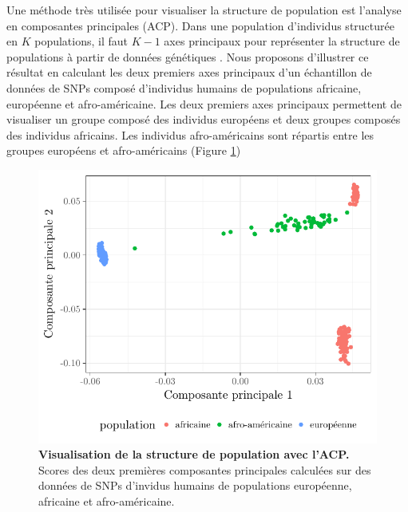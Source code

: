 \documentclass[12pt,a4paper,twoside]{ugathesis}
\begin{document}
Une méthode très utilisée pour visualiser la structure de population est
l'analyse en composantes principales (ACP). Dans une population d'individus
structurée en \(K\) populations, il faut \(K-1\) axes principaux pour représenter la
structure de populations à partir de données génétiques \citep{Patterson_2006}.
Nous proposons d'illustrer ce résultat en calculant les deux premiers axes
principaux d'un échantillon de données de SNPs composé d'individus humains de
populations africaine, européenne et afro-américaine. Les deux premiers axes
principaux permettent de visualiser un groupe composé des individus européens et
deux groupes composés des individus africains. Les individus afro-américains
sont répartis entre les groupes européens et afro-américains (Figure
\ref{fig:tess3_intro_pca})

\begin{figure}[h]
\centering
\includegraphics{./OUTPUT/Rplots/tess3_intro_pca.pdf}
\caption{{\bf Visualisation de la structure de population avec l'ACP.} Scores
  des deux premières composantes principales calculées sur des données de SNPs
  d'invidus humains de populations européenne, africaine et afro-américaine.}
\label{fig:tess3_intro_pca}
\end{figure}
\end{document}
